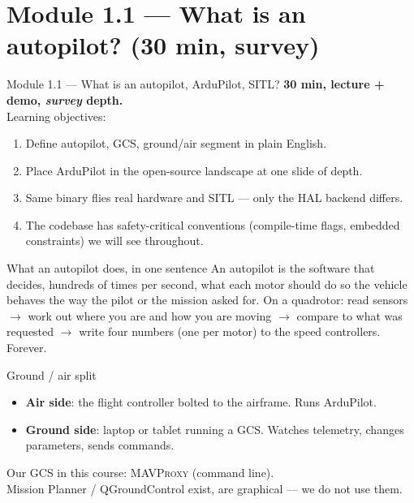 \documentclass[aspectratio=169,11pt]{beamer}
\begin{document}
\section{Module 1.1 --- What is an autopilot? (30 min, survey)}

\begin{frame}{Module 1.1 --- What is an autopilot, ArduPilot, SITL?}
  \textbf{30 min, lecture + demo, \emph{survey} depth.}\\[1ex]
  Learning objectives:
  \begin{enumerate}
    \item Define autopilot, GCS, ground/air segment in plain English.
    \item Place ArduPilot in the open-source landscape at one slide of depth.
    \item Same binary flies real hardware and SITL --- only the HAL backend differs.
    \item The codebase has safety-critical conventions (compile-time flags, embedded constraints) we will see throughout.
  \end{enumerate}
\end{frame}

\begin{frame}{What an autopilot does, in one sentence}
  An autopilot is the software that decides, hundreds of times per second, what each motor should do so the vehicle behaves the way the pilot or the mission asked for.
  \vfill
  On a quadrotor: read sensors $\rightarrow$ work out where you are and how you are moving $\rightarrow$ compare to what was requested $\rightarrow$ write four numbers (one per motor) to the speed controllers. Forever.
\end{frame}

\begin{frame}{Ground / air split}
  \begin{itemize}
    \item \textbf{Air side}: the flight controller bolted to the airframe. Runs ArduPilot.
    \item \textbf{Ground side}: laptop or tablet running a GCS. Watches telemetry, changes parameters, sends commands.
  \end{itemize}
  \vfill
  Our GCS in this course: \textsc{MAVProxy} (command line).\\
  Mission Planner / QGroundControl exist, are graphical --- we do not use them.
\end{frame}
\end{document}
